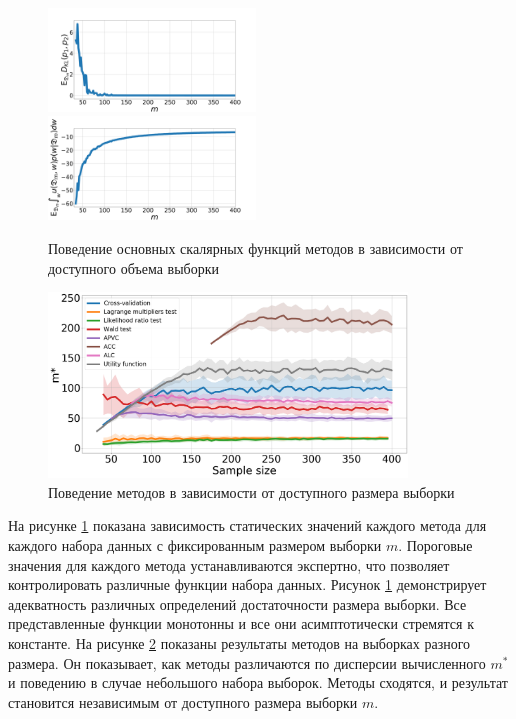 \begin{figure}[h!t]
    \includegraphics[width=0.49\textwidth]{results/samplesize/kl.pdf}\\
    \includegraphics[width=0.49\textwidth]{results/samplesize/maxu.pdf}
    \caption{Поведение основных скалярных функций методов в зависимости от доступного объема выборки}
    \label{fig1}
\end{figure}

\begin{figure}[h!t]\center
    \includegraphics[width=0.85\textwidth]{results/samplesize/graphs.png}
    \caption{Поведение методов в зависимости от доступного размера выборки}
    \label{fig2}
\end{figure}

На рисунке \ref{fig1} показана зависимость статических значений каждого метода для каждого набора данных с фиксированным размером выборки $m$. Пороговые значения для каждого метода устанавливаются экспертно, что позволяет контролировать различные функции набора данных. Рисунок \ref{fig1} демонстрирует адекватность различных определений достаточности размера выборки. Все представленные функции монотонны и все они асимптотически стремятся к константе.
На рисунке \ref{fig2} показаны результаты методов на выборках разного размера. Он показывает, как методы различаются по дисперсии вычисленного $m^*$ и поведению в случае небольшого набора выборок. Методы сходятся, и результат становится независимым от  доступного размера выборки $m$.   
 

